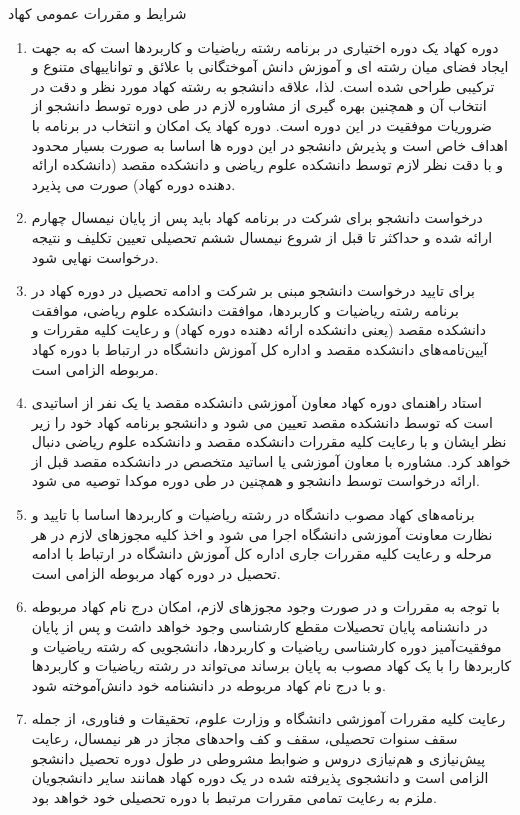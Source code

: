 \documentclass{article}
\begin{document}
شرایط و مقررات عمومی کهاد
\begin{enumerate}
    \item
     دوره کهاد یک دوره اختیاری در برنامه رشته ریاضیات و کاربردها است که به جهت ایجاد فضای میان رشته ای و آموزش دانش آموختگانی با علائق و تواناییهای متنوع و ترکیبی طراحی شده است. لذا، علاقه دانشجو به رشته کهاد مورد نظر و دقت در انتخاب آن و همچنین بهره گیری از مشاوره لازم در طی دوره توسط دانشجو از ضروریات موفقیت در این دوره است. دوره کهاد یک امکان و انتخاب در برنامه با اهداف خاص است و پذیرش دانشجو در این دوره ها اساسا به صورت بسیار محدود و با دقت نظر لازم توسط دانشکده علوم ریاضی و دانشکده مقصد (دانشکده ارائه دهنده دوره کهاد) صورت می پذیرد.
	\item
	 درخواست دانشجو برای شرکت در برنامه کهاد باید پس از پایان نیمسال چهارم ارائه شده و حداکثر تا قبل از شروع نیمسال ششم تحصیلی تعیین تکلیف و نتیجه درخواست نهایی شود.
	\item
	 برای تایید درخواست دانشجو مبنی بر شرکت و ادامه تحصیل در دوره کهاد در برنامه رشته ریاضیات و کاربردها، موافقت دانشکده علوم ریاضی، موافقت دانشکده مقصد (یعنی دانشکده ارائه دهنده دوره کهاد) و رعایت کلیه مقررات و آیین‌نامه‌های دانشکده مقصد و اداره کل آموزش دانشگاه در ارتباط با دوره کهاد مربوطه الزامی است.
	\item
	 استاد راهنمای دوره کهاد معاون آموزشی دانشکده مقصد یا یک نفر از اساتیدی است که توسط دانشکده مقصد تعیین می شود و دانشجو برنامه کهاد خود را زیر نظر ایشان و با رعایت کلیه مقررات دانشکده مقصد و دانشکده علوم ریاضی دنبال خواهد کرد. مشاوره با معاون آموزشی یا اساتید متخصص در دانشکده مقصد قبل از ارائه درخواست توسط دانشجو و همچنین در طی دوره موکدا توصیه می شود.
	\item
	 برنامه‌های کهاد مصوب دانشگاه در رشته ریاضیات و کاربردها اساسا با تایید و نظارت معاونت آموزشی دانشگاه اجرا می شود و اخذ کلیه مجوزهای لازم در هر مرحله و رعایت کلیه مقررات جاری اداره کل آموزش دانشگاه در ارتباط با ادامه تحصیل در دوره کهاد مربوطه الزامی است.
	\item
	 با توجه به مقررات و در صورت وجود مجوزهای لازم، امکان درج نام کهاد مربوطه در دانشنامه پایان تحصیلات مقطع کارشناسی وجود خواهد داشت و پس از پایان موفقیت‌آمیز دوره کارشناسی ریاضیات و کاربردها، دانشجویی که رشته ریاضیات و کاربردها را با یک کهاد مصوب به پایان برساند می‌تواند در رشته ریاضیات و کاربردها و با درج نام کهاد مربوطه در دانشنامه خود دانش‌آموخته شود.
	\item
	رعایت کلیه مقررات آموزشی دانشگاه و وزارت علوم، تحقیقات و فناوری، از جمله سقف سنوات تحصیلی، سقف و کف واحدهای مجاز در هر نیمسال، رعایت پیش‌نیازی و هم‌نیازی دروس و ضوابط مشروطی در طول دوره تحصیل دانشجو الزامی است و دانشجوی پذیرفته شده در یک دوره کهاد همانند سایر دانشجویان ملزم به رعایت تمامی مقررات مرتبط با دوره تحصیلی خود خواهد بود.
\end{enumerate}
\end{document}
